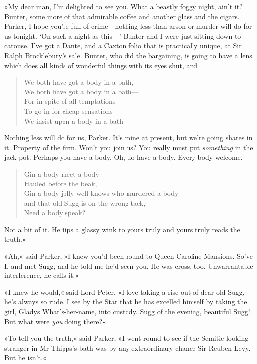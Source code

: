 »My dear man, I'm delighted to see you. What a beastly foggy night, ain't it? Bunter, some more of that admirable coffee and another glass and the cigars. Parker, I hope you're full of crime\allowbreak---\allowbreak nothing less than arson or murder will do for us tonight. ‘On such a night as this---' Bunter and I were just sitting down to carouse. I've got a Dante, and a Caxton folio that is practically unique, at Sir Ralph Brocklebury's sale. Bunter, who did the bargaining, is going to have a lens which does all kinds of wonderful things with its eyes shut, and

\begin{verse}
We both have got a body in a bath,\\
We both have got a body in a bath---\\
For in spite of all temptations\\
To go in for cheap sensations\\
We insist upon a body in a bath---\\
\end{verse}

Nothing less will do for us, Parker. It's mine at present, but we're going shares in it. Property of the firm. Won't you join us? You really must put \textit{something} in the jack-pot. Perhaps you have a body. Oh, do have a body. Every body welcome.

\begin{verse}
Gin a body meet a body\\
Hauled before the beak,\\
Gin a body jolly well knows who murdered a body\\
and that old Sugg is on the wrong tack,\\
Need a body speak?
\end{verse}

Not a bit of it. He tips a glassy wink to yours truly and yours truly reads the truth.«

»Ah,« said Parker, »I knew you'd been round to Queen Caroline Mansions. So've I, and met Sugg, and he told me he'd seen you. He was cross, too. Unwarrantable interference, he calls it.«

»I knew he would,« said Lord Peter. »I love taking a rise out of dear old Sugg, he's always so rude. I see by the Star that he has excelled himself by taking the girl, Gladys What's-her-name, into custody. Sugg of the evening, beautiful Sugg! But what were \textit{you} doing there?«

»To tell you the truth,« said Parker, »I went round to see if the Semitic-looking stranger in Mr Thipps's bath was by any extraordinary chance Sir Reuben Levy. But he isn't.«

